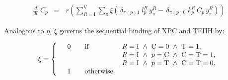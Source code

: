 \begin{eqnarray}\label{Eqn:concentration}
\frac{d}{dt}\;C_p&=&\,r\left(\sum_{R=\text{I}}^{\text{V}} \sum_{\pi} \xi \left( \,\delta_{\pi (p)1}\;l_{p}^{ R}\, y_{\pi}^{R}- \,\delta_{\pi (p)0}\; k_{p}^{ R} \,C_p\,y_{\pi}^{R}\right)\right)
\end{eqnarray}  

Analogous to $\eta$, $\xi$ governs the sequential binding of XPC and TFIIH by:

\begin{align*}
\xi =\left\{
\begin{array}{l l ll}
& 0 \quad   &\text{if} & R=\text{I} ~\wedge~ \text{C}=0 ~\wedge~ \text{T}=1, \\
&    && R=\text{I} ~\wedge~ p=\text{C} ~\wedge~ \text{C}=\text{T}=1, \\
&    &&R=\text{I} ~\wedge~ p=\text{T} ~\wedge~ \text{C}=\text{T}=0, \\
& 1 \quad& \text{otherwise}.&
\end{array}
\right.
\end{align*}

